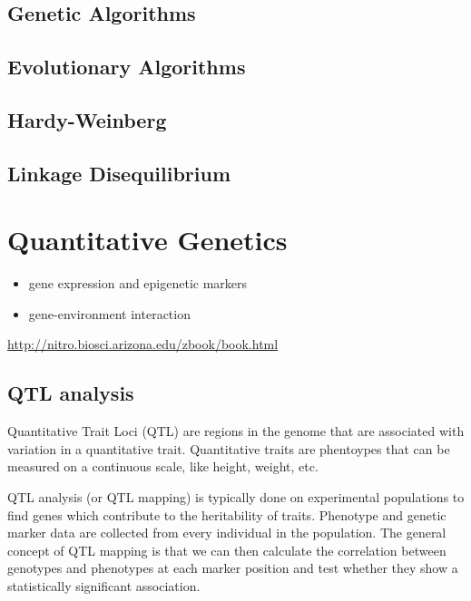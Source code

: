 \documentclass[12pt,]{krantz}
\theoremstyle{definition}
\theoremstyle{definition}
\theoremstyle{definition}
\theoremstyle{remark}
\begin{document}
\section{Genetic Algorithms}\label{genetic-algorithms}

\section{Evolutionary Algorithms}\label{evolutionary-algorithms}

\section{Hardy-Weinberg}\label{hardy-weinberg}

\section{Linkage Disequilibrium}\label{linkage-disequilibrium}

\chapter{Quantitative Genetics}\label{quantitative-genetics}

\begin{itemize}
\item
  gene expression and epigenetic markers
\item
  gene-environment interaction
\end{itemize}

\url{http://nitro.biosci.arizona.edu/zbook/book.html}

\section{QTL analysis}\label{qtl-analysis}

Quantitative Trait Loci (QTL) are regions in the genome that are
associated with variation in a quantitative trait. Quantitative traits
are phentoypes that can be measured on a continuous scale, like height,
weight, etc.

QTL analysis (or QTL mapping) is typically done on experimental
populations to find genes which contribute to the heritability of
traits. Phenotype and genetic marker data are collected from every
individual in the population. The general concept of QTL mapping is that
we can then calculate the correlation between genotypes and phenotypes
at each marker position and test whether they show a statistically
significant association.
\end{document}

